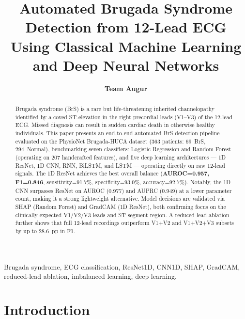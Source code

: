 \documentclass[journal, 10pt, twoside]{IEEEtran}
\begin{document}
\title{Automated Brugada Syndrome Detection from 12-Lead ECG\\
       Using Classical Machine Learning and Deep Neural Networks}

\author{%
\textbf{Team Augur} \\
}

\maketitle

\begin{abstract}
Brugada syndrome (BrS) is a rare but life-threatening inherited
channelopathy identified by a coved ST-elevation in the right precordial
leads (V1--V3) of the 12-lead ECG.
Missed diagnosis can result in sudden cardiac death in otherwise
healthy individuals.
This paper presents an end-to-end automated BrS detection pipeline
evaluated on the PhysioNet Brugada-HUCA dataset (363 patients:
69~BrS, 294~Normal), benchmarking seven classifiers:
Logistic Regression and Random Forest (operating on 207 handcrafted
features), and five deep learning architectures — 1D ResNet, 1D CNN,
RNN, BiLSTM, and LSTM — operating directly on raw 12-lead signals.
The 1D ResNet achieves the best overall balance
(\textbf{AUROC=0.957, F1=0.846},
sensitivity=91.7\%, specificity=93.0\%, accuracy=92.7\%).
Notably, the 1D CNN surpasses ResNet on AUROC (0.977) and AUPRC (0.949)
at a lower parameter count, making it a strong lightweight alternative.
Model decisions are validated via SHAP (Random Forest) and GradCAM
(1D ResNet), both confirming focus on the clinically expected
V1/V2/V3 leads and ST-segment region.
A reduced-lead ablation further shows that full 12-lead recordings
outperform V1+V2 and V1+V2+V3 subsets by up to 28.6~pp in F1.
\end{abstract}

\begin{IEEEkeywords}
Brugada syndrome, ECG classification, ResNet1D, CNN1D, SHAP, GradCAM,
reduced-lead ablation, imbalanced learning, deep learning.
\end{IEEEkeywords}

\section{Introduction}
\label{sec:intro}
\end{document}
